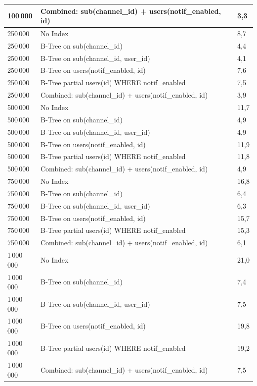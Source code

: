 \begin{longtable}{|p{2.4cm}|p{9.9cm}|p{2.3cm}|}
    100\,000 & Combined: sub(channel\_id) + users(notif\_enabled, id) & 3,3 \\
    \hline
    250\,000 & No Index & 8,7 \\
    \hline
    250\,000 & B-Tree on sub(channel\_id) & 4,4 \\
    \hline
    250\,000 & B-Tree on sub(channel\_id, user\_id) & 4,1 \\
    \hline
    250\,000 & B-Tree on users(notif\_enabled, id) & 7,6 \\
    \hline
    250\,000 & B-Tree partial users(id) WHERE notif\_enabled & 7,5 \\
    \hline
    250\,000 & Combined: sub(channel\_id) + users(notif\_enabled, id) & 3,9 \\
    \hline
    500\,000 & No Index & 11,7 \\
    \hline
    500\,000 & B-Tree on sub(channel\_id) & 4,9 \\
    \hline
    500\,000 & B-Tree on sub(channel\_id, user\_id) & 4,9 \\
    \hline
    500\,000 & B-Tree on users(notif\_enabled, id) & 11,9 \\
    \hline
    500\,000 & B-Tree partial users(id) WHERE notif\_enabled & 11,8 \\
    \hline
    500\,000 & Combined: sub(channel\_id) + users(notif\_enabled, id) & 4,9 \\
    \hline
    750\,000 & No Index & 16,8 \\
    \hline
    750\,000 & B-Tree on sub(channel\_id) & 6,4 \\
    \hline
    750\,000 & B-Tree on sub(channel\_id, user\_id) & 6,3 \\
    \hline
    750\,000 & B-Tree on users(notif\_enabled, id) & 15,7 \\
    \hline
    750\,000 & B-Tree partial users(id) WHERE notif\_enabled & 15,3 \\
    \hline
    750\,000 & Combined: sub(channel\_id) + users(notif\_enabled, id) & 6,1 \\
    \hline
    1\,000\,000 & No Index & 21,0 \\
    \hline
    1\,000\,000 & B-Tree on sub(channel\_id) & 7,4 \\
    \hline
    1\,000\,000 & B-Tree on sub(channel\_id, user\_id) & 7,5 \\
    \hline
    1\,000\,000 & B-Tree on users(notif\_enabled, id) & 19,8 \\
    \hline
    1\,000\,000 & B-Tree partial users(id) WHERE notif\_enabled & 19,2 \\
    \hline
    1\,000\,000 & Combined: sub(channel\_id) + users(notif\_enabled, id) & 7,5 \\
    \hline
\end{longtable}

